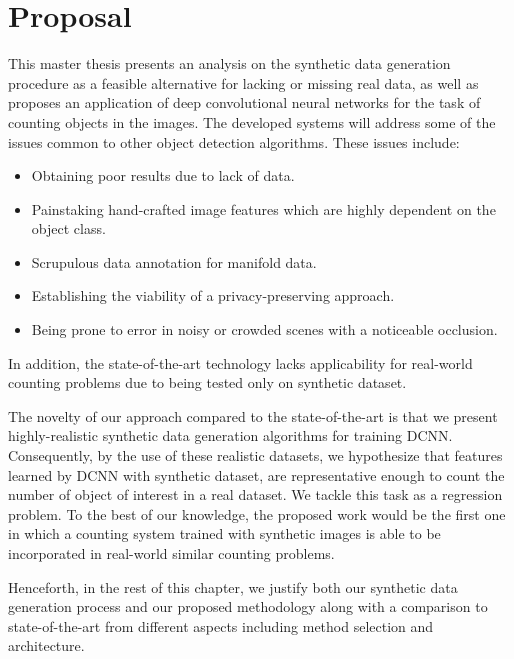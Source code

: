 \newpage
\chapter{Proposal}
\label{sec:proposal}
\noindent

This master thesis presents an analysis on the synthetic data generation procedure as a feasible alternative for lacking or missing real data, as well as proposes an application of deep convolutional neural networks for the task of counting objects in the images. The developed systems will address some of the issues common to other object detection algorithms. These issues include: 

\begin{itemize}
	
	\item Obtaining poor results due to lack of data. 
	\item Painstaking hand-crafted image features which are highly dependent on the object class. 
	\item Scrupulous data annotation for manifold data. 
	\item Establishing the viability of a privacy-preserving approach. 
	\item Being prone to error in noisy or crowded scenes with a noticeable occlusion. 

\end{itemize} 
In addition, the state-of-the-art \cite{segui2015learning} technology lacks applicability for real-world counting problems due to being tested only on synthetic dataset.


The novelty of our approach compared to the state-of-the-art is that we present highly-realistic synthetic data generation algorithms for training DCNN. Consequently, by the use of these realistic datasets, we hypothesize that features learned by DCNN with synthetic dataset, are representative enough to count the number of object of interest in a real dataset. We tackle this task as a regression problem. 
To the best of our knowledge, the proposed work would be the first one in which a counting system trained with synthetic images is able to be incorporated in real-world similar counting problems.

Henceforth, in the rest of this chapter, we justify both our synthetic data generation process and our proposed methodology along with a comparison to state-of-the-art from different aspects including method selection and architecture.   

